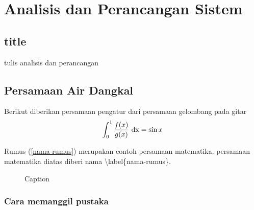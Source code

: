 \chapter{Analisis dan Perancangan Sistem}
\section{title}

tulis analisis dan perancangan

\section{Persamaan Air Dangkal}
Berikut diberikan persamaan pengatur dari persamaan gelombang pada gitar
\begin{equation}\label{nama-rumus}
\int_0^1 \frac{f(x)}{g(x)}\ {\rm dx}=\sin x
\end{equation}

Rumus (\ref{nama-rumus}) merupakan contoh persamaan matematika. persamaan matematika diatas diberi nama \textbackslash label\{nama-rumus\}.

\begin{figure}[h!]
	\centering
	\caption{Caption}
	\label{fig:my_label}
\end{figure}
\subsection{Cara memanggil pustaka}
